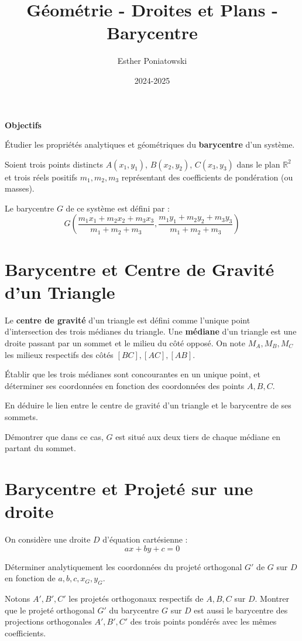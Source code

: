 \documentclass[10pt,a4paper]{article}
\title{Géométrie - Droites et Plans - Barycentre}
\author{Esther Poniatowski}
\date{2024-2025}
\begin{document}
\textbf{Objectifs}

Étudier les propriétés analytiques et géométriques du \textbf{barycentre} d'un système.

Soient trois points distincts $A(x_1, y_1)$, $B(x_2, y_2)$, $C(x_3, y_3)$ dans le plan
$\mathbb{R}^2$ et trois réels positifs $m_1, m_2, m_3$ représentant des coefficients de pondération
(ou masses).

Le barycentre $G$ de ce système est défini par :
$$
G \left( \frac{m_1 x_1 + m_2 x_2 + m_3 x_3}{m_1 + m_2 + m_3},
         \frac{m_1 y_1 + m_2 y_2 + m_3 y_3}{m_1 + m_2 + m_3} \right)
$$


\section{Barycentre et Centre de Gravité d'un Triangle}


Le \textbf{centre de gravité} d'un triangle est défini comme l'unique point d'intersection des trois
médianes du triangle.
Une \textbf{médiane} d'un triangle est une droite passant par un sommet et le milieu du côté
opposé. On note $M_A, M_B, M_C$ les milieux respectifs des côtés $[BC], [AC], [AB]$.

\q Établir que les trois médianes sont concourantes en un unique point, et déterminer ses
coordonnées en fonction des coordonnées des points $A, B, C$.

\q En déduire le lien entre le centre de gravité d'un triangle et le barycentre de ses sommets.

\q Démontrer que dans ce cas, $G$ est situé aux deux tiers de chaque médiane en partant du sommet.


\section{Barycentre et Projeté sur une droite}

On considère une droite $D$ d'équation cartésienne :
$$ax + by + c = 0$$

\q Déterminer analytiquement les coordonnées du projeté orthogonal $G'$ de $G$ sur $D$ en fonction
de $a, b, c, x_G, y_G$.

\q Notons $A', B', C'$ les projetés orthogonaux respectifs de $A, B, C$ sur $D$. Montrer que le
projeté orthogonal $G'$ du barycentre $G$ sur $D$ est aussi le barycentre des projections
orthogonales $A', B', C'$ des trois points pondérés avec les mêmes coefficients.
\end{document}
